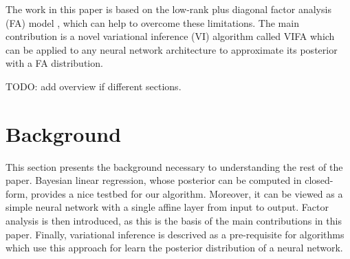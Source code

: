 \documentclass[10pt]{article} %
\begin{document}
The work in this paper is based on the low-rank plus diagonal factor analysis (FA) model \citep{barber2007}, which can help to overcome these limitations. The main contribution is a novel variational inference (VI) algorithm called VIFA which can be applied to any neural network architecture to approximate its posterior with a FA distribution. 

TODO: add overview if different sections.

\section{Background}
This section presents the background necessary to understanding the rest of the paper. Bayesian linear regression, whose posterior can be computed in closed-form, provides a nice testbed for our algorithm. Moreover, it can be viewed as a simple neural network with a single affine layer from input to output. Factor analysis is then introduced, as this is the basis of the main contributions in this paper. Finally, variational inference is descrived as a pre-requisite for algorithms which use this approach for learn the posterior distribution of a neural network.
\end{document}
